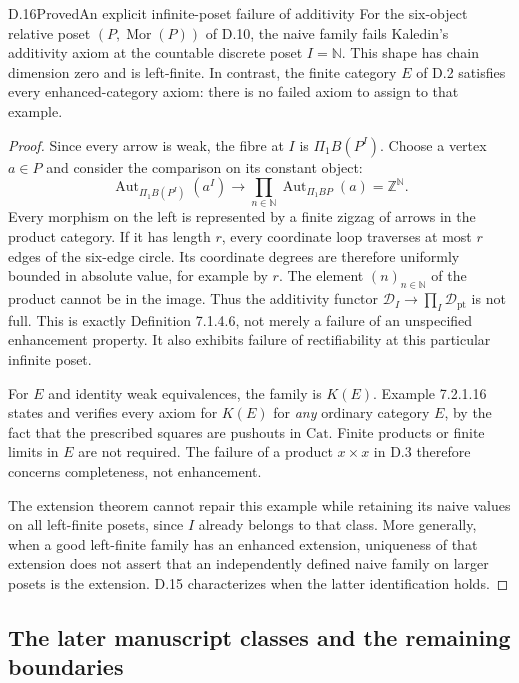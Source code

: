 \begin{result}{D.16}{Proved}{An explicit infinite-poset failure of additivity}
For the six-object relative poset $(P,\operatorname{Mor}(P))$ of D.10,
the naive family fails Kaledin's additivity axiom at the countable
discrete poset $I=\mathbb N$. This shape has chain dimension zero
and is left-finite. In contrast, the finite category $E$ of D.2
satisfies every enhanced-category axiom: there is no failed axiom
to assign to that example.
\end{result}
\begin{proof}
Since every arrow is weak, the fibre at $I$ is
$\Pi_1 B(P^I)$. Choose a vertex $a\in P$ and consider the comparison
on its constant object:
\[
 \operatorname{Aut}_{\Pi_1 B(P^I)}(a^I)
       \longrightarrow
 \prod_{n\in\mathbb N}\operatorname{Aut}_{\Pi_1 BP}(a)
       =\mathbb Z^{\mathbb N}.
\]
Every morphism on the left is represented by a finite zigzag of
arrows in the product category. If it has length $r$, every
coordinate loop traverses at most $r$ edges of the six-edge circle.
Its coordinate degrees are therefore uniformly bounded in absolute
value, for example by $r$. The element $(n)_{n\in\mathbb N}$ of
the product cannot be in the image. Thus the additivity functor
$\mathcal D_I\to\prod_I\mathcal D_{\mathrm{pt}}$ is not full.
This is exactly Definition 7.1.4.6, not merely a failure of an
unspecified enhancement property. It also exhibits failure of
rectifiability at this particular infinite poset.

For $E$ and identity weak equivalences, the family is $K(E)$.
Example 7.2.1.16 states and verifies every axiom for $K(E)$ for
\emph{any} ordinary category $E$, by the fact that the prescribed
squares are pushouts in $\mathrm{Cat}$. Finite products or finite
limits in $E$ are not required. The failure of a product $x\times x$
in D.3 therefore concerns completeness, not enhancement.

The extension theorem cannot repair this example while retaining its
naive values on all left-finite posets, since $I$ already belongs to
that class. More generally, when a good left-finite family has an
enhanced extension, uniqueness of that extension does not assert
that an independently defined naive family on larger posets is the
extension. D.15 characterizes when the latter identification holds.
\end{proof}

\subsection{The later manuscript classes and the remaining boundaries}

